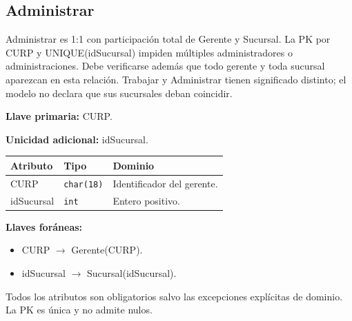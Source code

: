 \par\noindent\begin{minipage}{\textwidth}
\subsection{Administrar}
Administrar es 1:1 con participación total de Gerente y Sucursal. La PK por CURP y UNIQUE(idSucursal) impiden múltiples administradores o administraciones. Debe verificarse además que todo gerente y toda sucursal aparezcan en esta relación. Trabajar y Administrar tienen significado distinto; el modelo no declara que sus sucursales deban coincidir.\par
\textbf{Llave primaria:} CURP.\par
\textbf{Unicidad adicional:} idSucursal.\par
{\small\begin{tabular}{@{}p{}p{}p{}@{}}
\toprule Atributo & Tipo & Dominio \\ \midrule
CURP & \texttt{char(18)} & Identificador del gerente. \\
idSucursal & \texttt{int} & Entero positivo. \\
\bottomrule\end{tabular}}
\textbf{Llaves foráneas:}\begin{itemize}[nosep]
\item CURP $\rightarrow$ Gerente(CURP).
\item idSucursal $\rightarrow$ Sucursal(idSucursal).
\end{itemize}
Todos los atributos son obligatorios salvo las excepciones explícitas de dominio. La PK es única y no admite nulos.
\end{minipage}\par\vspace{.35cm}